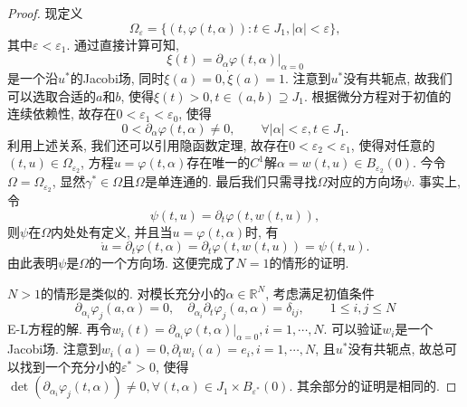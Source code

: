 \begin{proposition}
\begin{proof}
        现定义
        \begin{equation*}
            \Omega_{\varepsilon} = \{(t, \varphi(t, \alpha))\colon t \in J_1, |\alpha| < \varepsilon\}, 
        \end{equation*}
        其中$\varepsilon < \varepsilon_1$. 通过直接计算可知, 
        \begin{equation*}
            \xi(t) = \left.\partial_{\alpha}\varphi(t, \alpha)\right|_{\alpha = 0}
        \end{equation*}
        是一个沿$u^*$的Jacobi场, 同时$\xi(a) = 0, \dot\xi(a) = 1$. 注意到$u^*$没有共轭点, 故我们可以选取合适的$a$和$b$, 使得$\xi(t) > 0, t \in (a, b) \supseteq J_1$.
        根据微分方程对于初值的连续依赖性, 故存在$0 < \varepsilon_1 < \varepsilon_0$, 使得 
        \begin{equation*}
            0 < \partial_{\alpha}\varphi(t, \alpha) \neq 0, \qquad \forall |\alpha| < \varepsilon, t \in J_1.
        \end{equation*}
        利用上述关系, 我们还可以引用隐函数定理, 故存在$0 < \varepsilon_2 < \varepsilon_1$, 使得对任意的$(t, u) \in \Omega_{\varepsilon_2}$, 方程$u = \varphi(t, \alpha)$存在唯一的$C^1$解$\alpha = w(t, u) \in B_{\varepsilon_2}(0)$.
        今令$\Omega = \Omega_{\varepsilon_2}$, 显然$\gamma^* \in \Omega$且$\Omega$是单连通的.
        最后我们只需寻找$\Omega$对应的方向场$\psi$. 事实上, 令 
        \begin{equation*}
            \psi(t, u) = \partial_t\varphi(t, w(t, u)),
        \end{equation*}
        则$\psi$在$\Omega$内处处有定义, 并且当$u = \varphi(t, \alpha)$时, 有 
        \begin{equation*}
            \dot u = \partial_t\varphi(t, \alpha) = \partial_t\varphi(t, w(t, u)) = \psi(t, u).
        \end{equation*}
        由此表明$\psi$是$\Omega$的一个方向场. 这便完成了$N = 1$的情形的证明.

        $N > 1$的情形是类似的. 对模长充分小的$\alpha \in \mathbb{R}^N$, 考虑满足初值条件 
        \begin{equation*}
            \partial_{\alpha_i}\varphi_j(a, \alpha) = 0, \quad \partial_{\alpha_i}\partial_t\varphi_j(a, \alpha) = \delta_{ij}, \qquad 1 \leq i, j \leq N
        \end{equation*}
        E-L方程的解. 再令$w_i(t) = \partial_{\alpha_i}\varphi(t, \alpha)|_{\alpha = 0}, i = 1, \cdots, N$.
        可以验证$w_i$是一个Jacobi场. 注意到$w_i(a) = 0, \partial_tw_i(a) = e_i , i = 1, \cdots, N$, 且$u^*$没有共轭点, 故总可以找到一个充分小的$\varepsilon^* > 0$, 使得$\det(\partial_{\alpha_i}\varphi_j(t, \alpha)) \neq 0, \forall (t, \alpha) \in J_1 \times B_{\varepsilon^*}(0)$.
        其余部分的证明是相同的.
    \end{proof}
\end{proposition}

